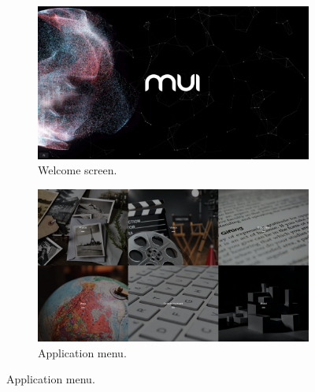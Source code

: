 \begin{figure}[p]
    \centering
    \begin{subfigure}{.47\textwidth}
        \centering
        \includegraphics[width=.96\linewidth]{Figures/LUI/UI/welcome_screen_lui.pdf}  
        \vspace{-5pt}
        \captionsetup{width=.9\linewidth}
        \caption{Welcome screen.}
        \label{fig:lui:screenshots:welcome-screen}
    \end{subfigure}
    \begin{subfigure}{.47\textwidth}
        \centering
        \includegraphics[width=.96\linewidth]{Figures/LUI/UI/app_menu.pdf}  
        \vspace{-5pt}
        \captionsetup{width=.9\linewidth}
        \caption{Application menu.}
        \label{fig:lui:screenshots:app-menu}
    \end{subfigure}


\end{figure}
